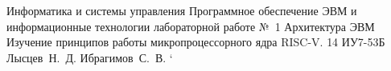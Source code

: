 \documentclass{bmstu}
\begin{document}
\makereporttitle
{Информатика и системы управления} %
{Программное обеспечение ЭВМ и информационные технологии} %
{лабораторной работе №~1} %
{Архитектура ЭВМ} %
{Изучение принципов работы микропроцессорного ядра RISC-V.} %
{14} %
{ИУ7-53Б} %
{Лысцев~Н.~Д.} %
{Ибрагимов~С.~В.} `

\maketableofcontents





% 
\end{document}
